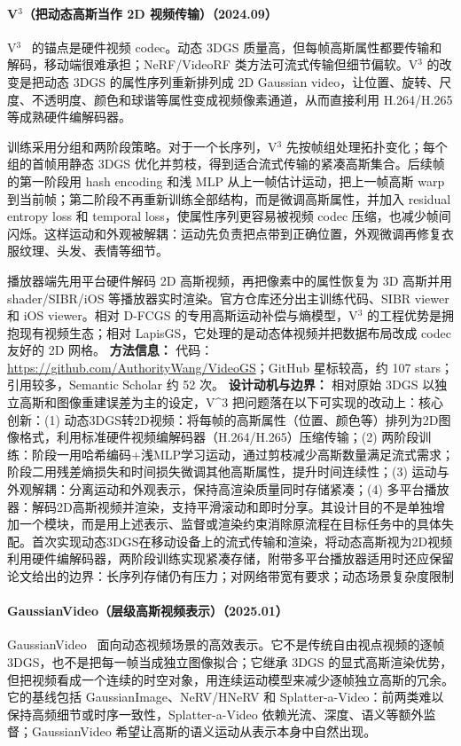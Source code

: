 \paragraph{V$^3$（把动态高斯当作 2D 视频传输）（2024.09）}
V$^3$~\cite{2409_13648} 的锚点是硬件视频 codec。动态 3DGS 质量高，但每帧高斯属性都要传输和解码，移动端很难承担；NeRF/VideoRF 类方法可流式传输但细节偏软。V$^3$ 的改变是把动态 3DGS 的属性序列重新排列成 2D Gaussian video，让位置、旋转、尺度、不透明度、颜色和球谐等属性变成视频像素通道，从而直接利用 H.264/H.265 等成熟硬件编解码器。

训练采用分组和两阶段策略。对于一个长序列，V$^3$ 先按帧组处理拓扑变化；每个组的首帧用静态 3DGS 优化并剪枝，得到适合流式传输的紧凑高斯集合。后续帧的第一阶段用 hash encoding 和浅 MLP 从上一帧估计运动，把上一帧高斯 warp 到当前帧；第二阶段不再重新训练全部结构，而是微调高斯属性，并加入 residual entropy loss 和 temporal loss，使属性序列更容易被视频 codec 压缩，也减少帧间闪烁。这样运动和外观被解耦：运动先负责把点带到正确位置，外观微调再修复衣服纹理、头发、表情等细节。

播放器端先用平台硬件解码 2D 高斯视频，再把像素中的属性恢复为 3D 高斯并用 shader/SIBR/iOS 等播放器实时渲染。官方仓库还分出主训练代码、SIBR viewer 和 iOS viewer。相对 D-FCGS 的专用高斯运动补偿与熵模型，V$^3$ 的工程优势是拥抱现有视频生态；相对 LapisGS，它处理的是动态体视频并把数据布局改成 codec 友好的 2D 网格。
\textbf{方法信息：} 代码：\url{https://github.com/AuthorityWang/VideoGS}；GitHub 星标较高，约 107 stars；引用较多，Semantic Scholar 约 52 次。
\textbf{设计动机与边界：} 相对原始 3DGS 以独立高斯和图像重建误差为主的设定，V\^{}3 把问题落在以下可实现的改动上：核心创新：(1) 动态3DGS转2D视频：将每帧的高斯属性（位置、颜色等）排列为2D图像格式，利用标准硬件视频编解码器（H.264/H.265）压缩传输；(2) 两阶段训练：阶段一用哈希编码+浅MLP学习运动，通过剪枝减少高斯数量满足流式需求；阶段二用残差熵损失和时间损失微调其他高斯属性，提升时间连续性；(3) 运动与外观解耦：分离运动和外观表示，保持高渲染质量同时存储紧凑；(4) 多平台播放器：解码2D高斯视频并渲染，支持平滑滚动和即时分享。其设计目的不是单独增加一个模块，而是用上述表示、监督或渲染约束消除原流程在目标任务中的具体失配。首次实现动态3DGS在移动设备上的流式传输和渲染，将动态高斯视为2D视频利用硬件编解码器，两阶段训练实现紧凑存储，附带多平台播放器适用时还应保留论文给出的边界：长序列存储仍有压力；对网络带宽有要求；动态场景复杂度限制
\paragraph{GaussianVideo（层级高斯视频表示）（2025.01）}
GaussianVideo~\cite{2501_04782} 面向动态视频场景的高效表示。它不是传统自由视点视频的逐帧 3DGS，也不是把每一帧当成独立图像拟合；它继承 3DGS 的显式高斯渲染优势，但把视频看成一个连续的时空对象，用连续运动模型来减少逐帧独立高斯的冗余。它的基线包括 GaussianImage、NeRV/HNeRV 和 Splatter-a-Video：前两类难以保持高频细节或时序一致性，Splatter-a-Video 依赖光流、深度、语义等额外监督；GaussianVideo 希望让高斯的语义运动从表示本身中自然出现。

